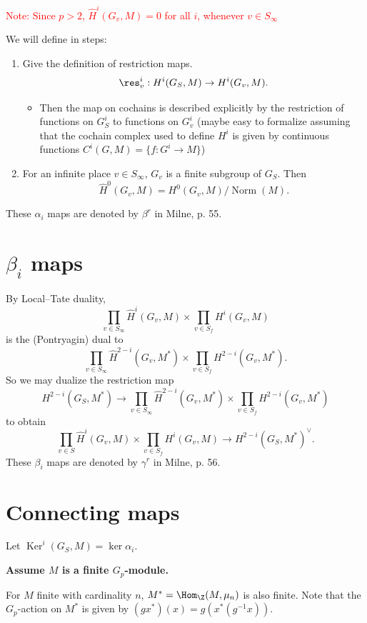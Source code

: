 \documentclass[11pt]{article}
\begin{document}
\textcolor{red}{Note: Since \( p>2 \), \( \widehat{H}^i(G_v,M)=0 \) for all \( i \), whenever \( v\in S_\infty \)}

\bigskip
We will define in steps:
\begin{enumerate}
    \item Give the definition of restriction maps.
\[
\res_v^i : H^i (G_S, M) \to H^i (G_v, M).
\]

\begin{itemize}
    \item Then the map on cochains is described explicitly by the restriction of functions on $G_S^i$ to functions on $G_v^i$ (maybe easy to formalize assuming that the cochain complex used to define $H^i$ is given by continuous functions \( C^i(G, M) = \{f: G^i \to M\} \))
\end{itemize}
\item For an infinite place \( v\in S_\infty \), \( G_v \) is a finite subgroup of \( G_S \). Then
\[ \widehat{H}^0(G_v,M) = H^0(G_v,M)/\operatorname{Norm}(M). \]
\end{enumerate}
These \( \alpha_i \) maps are denoted by \( \beta^r \) in Milne, p. 55.

\section{$\beta_i$ maps}

By Local--Tate duality,
\[ \prod_{v\in S_\infty}\widehat{H}^i(G_v,M)\times\prod_{v\in S_f}H^i(G_v,M) \]
is the (Pontryagin) dual to
\[ \prod_{v\in S_\infty}\widehat{H}^{2-i}(G_v,M^*)\times\prod_{v\in S_f}H^{2-i}(G_v,M^*). \]
So we may dualize the restriction map
\[ H^{2-i}(G_{S},M^*)\to \prod_{v\in S_\infty}\widehat{H}^{2-i}(G_v,M^*)\times\prod_{v\in S_f}H^{2-i}(G_v,M^*) \]
to obtain
\[ \prod_{v\in S}\widehat{H}^{i}(G_v,M)\times\prod_{v\in S_f}H^{i}(G_v,M)\to H^{2-i}(G_{S},M^*)^\vee. \]
These \( \beta_i \) maps are denoted by \( \gamma^r \) in Milne, p. 56.

\section{Connecting maps}
Let \( \operatorname{Ker}^i(G_S,M)=\ker \alpha_i \).

\bigskip
\textbf{Assume $M$ is a finite $G_p$-module.}

\begin{lem}
    For $M$ finite with cardinality $n$, $M^* = \Hom_\Z (M, \mu_n)$ is also finite. Note that the $G_p$-action on $M^*$ is given by $(g x^*)(x) = g(x^* (g^{-1}x))$.
\end{lem}
\end{document}
